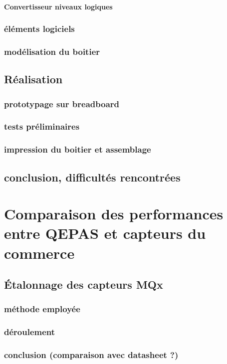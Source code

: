 \documentclass[a4paper]{report}
\begin{document}
\subsubsection{Convertisseur niveaux logiques}


	\subsection{éléments logiciels}
	\subsection{modélisation du boitier}
	
	\section{Réalisation}
	\subsection{prototypage sur breadboard}
	\subsection{tests préliminaires}
	\subsection{impression du boitier et assemblage}
	
	\section{conclusion, difficultés rencontrées}

	\chapter{Comparaison des performances entre QEPAS et capteurs du commerce}
	\section{Étalonnage des capteurs MQx}
	\subsection{méthode employée}
	\subsection{déroulement}
	\subsection{conclusion (comparaison avec datasheet ?)}
	
\end{document}
